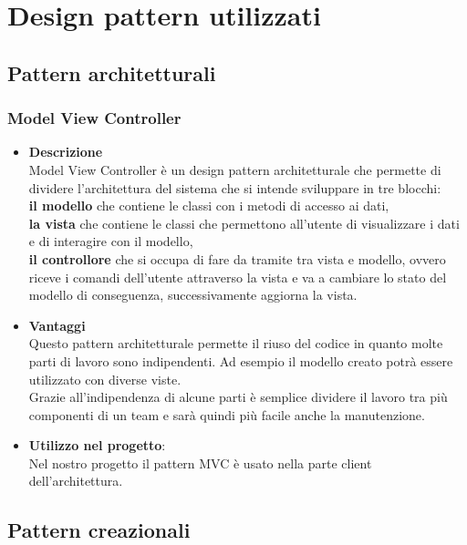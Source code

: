\newcommand{\utilizzo}{\item \textbf{Utilizzo nel progetto}}

\section{Design pattern utilizzati}
\label{pattern}
\subsection{Pattern architetturali}
	\subsubsection{Model View Controller}
		\begin{itemize}
			\item \textbf{Descrizione} \\ Model View Controller è un design pattern architetturale che permette di dividere l'architettura del sistema che si intende sviluppare in tre blocchi: \\
			\textbf{il modello} che contiene le classi con i metodi di accesso ai dati, \\
			\textbf{la vista} che contiene le classi che permettono all'utente di visualizzare i dati e di interagire con il modello, \\
			\textbf{il controllore} che si occupa di fare da tramite tra vista e modello, ovvero riceve i comandi dell'utente attraverso la vista e va a cambiare lo stato del modello di conseguenza, successivamente aggiorna la vista. \\
			
			\item \textbf{Vantaggi} \\
			Questo pattern architetturale permette il riuso del codice in quanto molte parti di lavoro sono indipendenti. Ad esempio il modello creato potrà essere utilizzato con diverse viste. \\ Grazie all'indipendenza di alcune parti è semplice dividere il lavoro tra più componenti di un team e sarà quindi più facile anche la manutenzione.
			\utilizzo: \\
			Nel nostro progetto il pattern MVC è usato nella parte client dell'architettura. 
		\end{itemize}
		
\subsection{Pattern creazionali}
